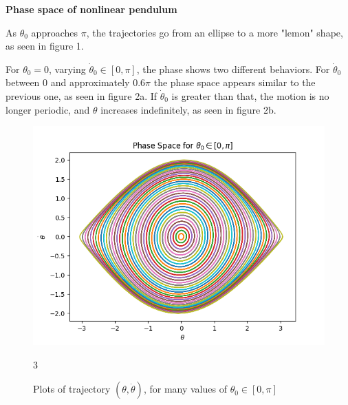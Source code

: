 \documentclass[12pt]{article}
\newenvironment{problem}[2][]{\begin{trivlist}
\item[\hskip \labelsep {\bfseries #1}\hskip \labelsep {\bfseries #2.}]}{\end{trivlist}}
\begin{document}
\begin{problem}{1}
	\textbf{Phase space of nonlinear pendulum}

	As $\theta_{0}$ approaches $\pi$, the trajectories go from an ellipse to a more "lemon" shape, as seen in figure 1.

	For $\theta_{0} = 0$, varying $\dot{\theta}_{0} \in [0,\pi]$, the phase shows two different behaviors.  For $\dot{\theta}_{0}$ between 0 and approximately $0.6\pi$ the phase space appears similar to the previous one, as seen in figure 2a.  If $\dot{\theta}_{0}$ is greater than that, the motion is no longer periodic, and $\theta$ increases indefinitely, as seen in figure 2b.

\begin{figure}[ht!]
	\centering
	\includegraphics[scale=0.6]{../figures/phaseSpace.png}
	\caption{Plots of trajectory $(\theta,\dot{\theta})$, for many values of $\theta_{0} \in [0,\pi]$}
	3\label{phase}
\end{figure}


\end{problem}
\end{document}
